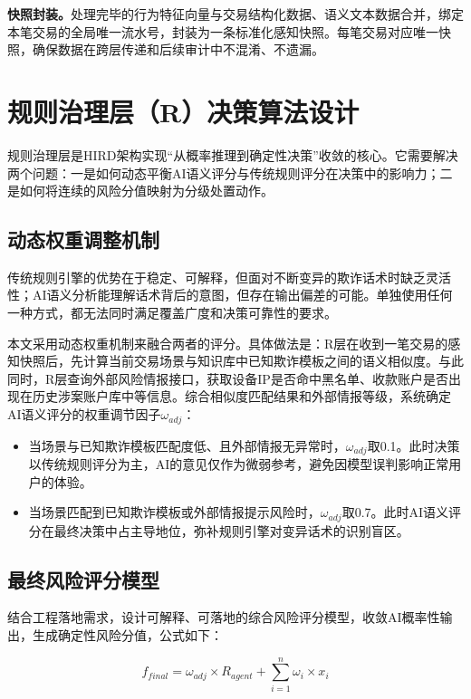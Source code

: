 \documentclass{xduugthesis}
\begin{document}
\textbf{快照封装。}处理完毕的行为特征向量与交易结构化数据、语义文本数据合并，绑定本笔交易的全局唯一流水号，封装为一条标准化感知快照。每笔交易对应唯一快照，确保数据在跨层传递和后续审计中不混淆、不遗漏。

\section{规则治理层（R）决策算法设计}

规则治理层是HIRD架构实现“从概率推理到确定性决策”收敛的核心。它需要解决两个问题：一是如何动态平衡AI语义评分与传统规则评分在决策中的影响力；二是如何将连续的风险分值映射为分级处置动作。

\subsection{动态权重调整机制}

传统规则引擎的优势在于稳定、可解释，但面对不断变异的欺诈话术时缺乏灵活性；AI语义分析能理解话术背后的意图，但存在输出偏差的可能\cite{haeri2025riskembed}。单独使用任何一种方式，都无法同时满足覆盖广度和决策可靠性的要求。

本文采用动态权重机制来融合两者的评分。具体做法是：R层在收到一笔交易的感知快照后，先计算当前交易场景与知识库中已知欺诈模板之间的语义相似度。与此同时，R层查询外部风险情报接口，获取设备IP是否命中黑名单、收款账户是否出现在历史涉案账户库中等信息。综合相似度匹配结果和外部情报等级，系统确定AI语义评分的权重调节因子$\omega_{adj}$：

\begin{itemize}
    \item 当场景与已知欺诈模板匹配度低、且外部情报无异常时，$\omega_{adj}$取0.1。此时决策以传统规则评分为主，AI的意见仅作为微弱参考，避免因模型误判影响正常用户的体验。
    \item 当场景匹配到已知欺诈模板或外部情报提示风险时，$\omega_{adj}$取0.7。此时AI语义评分在最终决策中占主导地位，弥补规则引擎对变异话术的识别盲区。
\end{itemize}

\subsection{最终风险评分模型}

结合工程落地需求，设计可解释、可落地的综合风险评分模型，收敛AI概率性输出，生成确定性风险分值，公式如下：

\begin{equation}
f_{final} = \omega_{adj} \times R_{agent} + \sum_{i=1}^{n} \omega_i \times x_i
\label{eq:final-score}
\end{equation}
\end{document}
